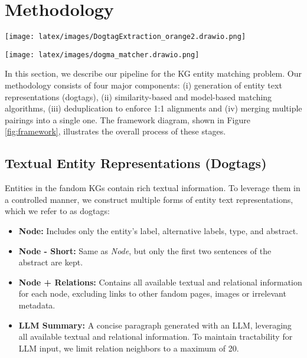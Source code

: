 \documentclass[11pt]{article}
\begin{document}
\section{Methodology}

\begin{figure*}[t] %
    \centering
    \texttt{[image: latex/images/DogtagExtraction\_orange2.drawio.png]}

    \vspace{-10px}
    \caption{Information used from the KG to create the representations}
    \label{fig:dogtag_extract}
\end{figure*}

\begin{figure*}[t] %
    \centering
    \texttt{[image: latex/images/dogma\_matcher.drawio.png]}
    \vspace{-22px}
    \caption{Proposed KG entity matching framework}
    \label{fig:framework}
\end{figure*}

In this section, we describe our pipeline for the KG entity matching problem. Our methodology consists of four major components: (i) generation of entity text representations (dogtags), (ii) similarity-based and model-based matching algorithms, (iii) deduplication to enforce 1:1 alignments and (iv) merging multiple pairings into a single one. The framework diagram, shown in Figure \ref{fig:framework}, illustrates the overall process of these stages.

\subsection{Textual Entity Representations (Dogtags)}

Entities in the fandom KGs contain rich textual information. To leverage them in a controlled manner, we construct multiple forms of entity text representations, which we refer to as dogtags:

\begin{itemize}[nosep]
    \setlength\itemsep{0em}
    \setlength\parskip{0em}
    \setlength\parsep{0em}
    \item \textbf{Node:} Includes only the entity’s label, alternative labels, type, and abstract.
    \item \textbf{Node - Short:} Same as \emph{Node}, but only the first two sentences of the abstract are kept.
    \item \textbf{Node + Relations:} Contains all available textual and relational information for each node, excluding links to other fandom pages, images or irrelevant metadata.
    \item \textbf{LLM Summary:} A concise paragraph generated with an LLM, leveraging all available textual and relational information. To maintain tractability for LLM input, we limit relation neighbors to a maximum of 20.
\end{itemize}
\end{document}
